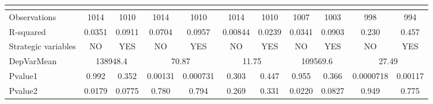 \begin{tabular}{rrrrrrrrrrr}
\multicolumn{1}{l}{} &       &       &       &       &       &       &       &       &       &  \\
\midrule
\multicolumn{1}{l}{Observations} & \multicolumn{1}{c}{1014} & \multicolumn{1}{c}{1010} & \multicolumn{1}{c}{1014} & \multicolumn{1}{c}{1010} & \multicolumn{1}{c}{1014} & \multicolumn{1}{c}{1010} & \multicolumn{1}{c}{1007} & \multicolumn{1}{c}{1003} & \multicolumn{1}{c}{998} & \multicolumn{1}{c}{994} \\
\multicolumn{1}{l}{R-squared} & \multicolumn{1}{c}{0.0351} & \multicolumn{1}{c}{0.0911} & \multicolumn{1}{c}{0.0704} & \multicolumn{1}{c}{0.0957} & \multicolumn{1}{c}{0.00844} & \multicolumn{1}{c}{0.0239} & \multicolumn{1}{c}{0.0341} & \multicolumn{1}{c}{0.0903} & \multicolumn{1}{c}{0.230} & \multicolumn{1}{c}{0.457} \\
\multicolumn{1}{l}{Strategic variables} & \multicolumn{1}{c}{NO} & \multicolumn{1}{c}{YES} & \multicolumn{1}{c}{NO} & \multicolumn{1}{c}{YES} & \multicolumn{1}{c}{NO} & \multicolumn{1}{c}{YES} & \multicolumn{1}{c}{NO} & \multicolumn{1}{c}{YES} & \multicolumn{1}{c}{NO} & \multicolumn{1}{c}{YES} \\
\multicolumn{1}{l}{DepVarMean} & \multicolumn{2}{c}{138948.4} & \multicolumn{2}{c}{70.87} & \multicolumn{2}{c}{11.75} & \multicolumn{2}{c}{109569.6} & \multicolumn{2}{c}{27.49} \\
\multicolumn{1}{l}{Pvalue1} & \multicolumn{1}{c}{0.992} & \multicolumn{1}{c}{0.352} & \multicolumn{1}{c}{0.00131} & \multicolumn{1}{c}{0.000731} & \multicolumn{1}{c}{0.303} & \multicolumn{1}{c}{0.447} & \multicolumn{1}{c}{0.955} & \multicolumn{1}{c}{0.366} & \multicolumn{1}{c}{0.0000718} & \multicolumn{1}{c}{0.00117} \\
\multicolumn{1}{l}{Pvalue2} & \multicolumn{1}{c}{0.0179} & \multicolumn{1}{c}{0.0775} & \multicolumn{1}{c}{0.780} & \multicolumn{1}{c}{0.794} & \multicolumn{1}{c}{0.269} & \multicolumn{1}{c}{0.331} & \multicolumn{1}{c}{0.0220} & \multicolumn{1}{c}{0.0827} & \multicolumn{1}{c}{0.949} & \multicolumn{1}{c}{0.775} \\
\bottomrule
\bottomrule
\end{tabular}%
